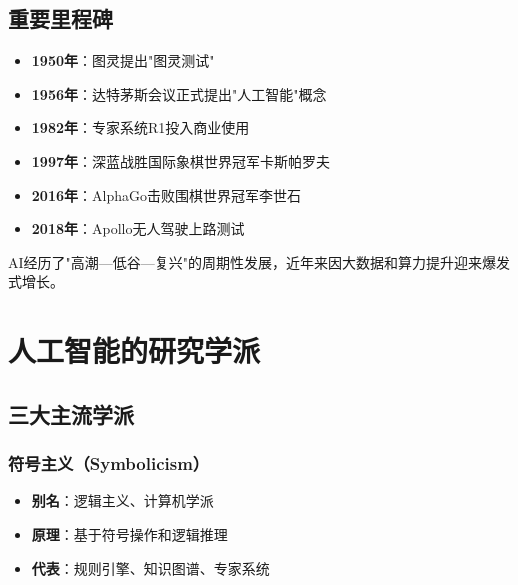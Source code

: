 \subsection{重要里程碑}
\begin{itemize}[leftmargin=2em,itemsep=0pt]
    \item \textbf{1950年}：图灵提出"图灵测试"
    \item \textbf{1956年}：达特茅斯会议正式提出"人工智能"概念
    \item \textbf{1982年}：专家系统R1投入商业使用
    \item \textbf{1997年}：深蓝战胜国际象棋世界冠军卡斯帕罗夫
    \item \textbf{2016年}：AlphaGo击败围棋世界冠军李世石
    \item \textbf{2018年}：Apollo无人驾驶上路测试
\end{itemize}

\begin{notebox}
AI经历了"高潮—低谷—复兴"的周期性发展，近年来因大数据和算力提升迎来爆发式增长。
\end{notebox}

\section{人工智能的研究学派}

\subsection{三大主流学派}

\begin{center}
\end{center}

\subsubsection{符号主义（Symbolicism）}
\begin{itemize}[leftmargin=2em,itemsep=0pt]
    \item \textbf{别名}：逻辑主义、计算机学派
    \item \textbf{原理}：基于符号操作和逻辑推理
    \item \textbf{代表}：规则引擎、知识图谱、专家系统
\end{itemize}

